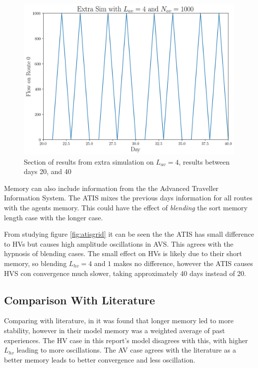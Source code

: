 \documentclass[12pt, a4paper, onecolumn]{article}
\begin{document}
\begin{figure}[h!]
	\centering
	\includegraphics[scale=.5]{av_l_extra.png}
	\caption{Section of results from extra simulation on $L_{av} = 4$, results between days 20, and 40}
	\label{fig:avlextra}
	\end{figure}

Memory can also include information from the the Advanced Traveller Information System. The ATIS mixes the previous days information for all routes with the agents memory. This could have the effect of \textit{blending} the sort memory length case with the longer case. 

From studying figure \ref{fig:atisgrid} it can be seen the the ATIS has small difference to HVs but causes high amplitude oscillations in AVS. This agrees with the hypnosis of blending cases. The small effect on HVs is likely due to their short memory, so blending $L_{hv} = 4$ and $1$ makes no difference, however the ATIS causes HVS con convergence much slower, taking approximately 40 days instead of 20.

\subsection{Comparison With Literature}
Comparing with literature, in \cite{Wei2014} it was found that longer memory led to more stability, however in their model memory was a weighted average of past experiences. The HV case in this report's model disagrees with this, with higher $L_{hv}$ leading to more oscillations. The AV case agrees with the literature as a better memory leads to better convergence and less oscillation.
\end{document}
